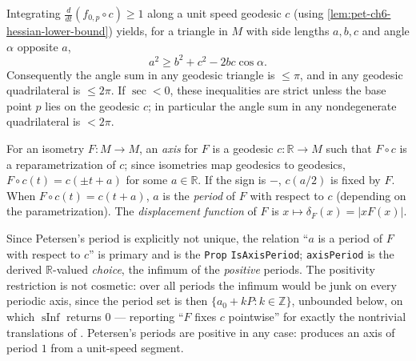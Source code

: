 \begin{remark}
  \label{rem:pet-ch6-triangle-comparison}
  Integrating $\frac{d}{dt}(f_{0,p}\circ c)\ge1$ along a unit speed geodesic
  $c$ (using \cref{lem:pet-ch6-hessian-lower-bound}) yields, for a triangle in
  $M$ with side lengths $a,b,c$ and angle $\alpha$ opposite $a$,
  \[
    a^2\ge b^2+c^2-2bc\cos\alpha.
  \]
  Consequently the angle sum in any geodesic triangle is $\le\pi$, and in any
  geodesic quadrilateral is $\le2\pi$. If $\sec<0$, these inequalities are
  strict unless the base point $p$ lies on the geodesic $c$; in particular the
  angle sum in any nondegenerate quadrilateral is $<2\pi$.
\end{remark}

\begin{definition}
  \label{def:pet-ch6-axis-displacement}
  \leanok
  For an isometry $F:M\to M$, an \emph{axis} for $F$ is a geodesic
  $c:\mathbb{R}\to M$ such that $F\circ c$ is a reparametrization of $c$; since
  isometries map geodesics to geodesics, $F\circ c(t)=c(\pm t+a)$ for some
  $a\in\mathbb{R}$. If the sign is $-$, $c(a/2)$ is fixed by $F$. When
  $F\circ c(t)=c(t+a)$, $a$ is the \emph{period} of $F$ with respect to $c$
  (depending on the parametrization). The \emph{displacement function} of $F$
  is $x\mapsto\delta_F(x)=|xF(x)|$.

  Since Petersen's period is explicitly not unique, the relation
  ``$a$ is a period of $F$ with respect to $c$'' is primary and is the
  \texttt{Prop} \texttt{IsAxisPeriod}; \texttt{axisPeriod} is the
  derived $\mathbb{R}$-valued \emph{choice}, the infimum of the
  \emph{positive} periods. The positivity restriction is not cosmetic: over all
  periods the infimum would be junk on every periodic axis, since the period
  set is then $\{a_0+kP:k\in\mathbb{Z}\}$, unbounded below, on which
  $\operatorname{sInf}$ returns $0$ --- reporting ``$F$ fixes $c$ pointwise''
  for exactly the nontrivial translations of .
  Petersen's periods are positive in any case: 
  produces an axis of period $1$ from a unit-speed segment.
\end{definition}

